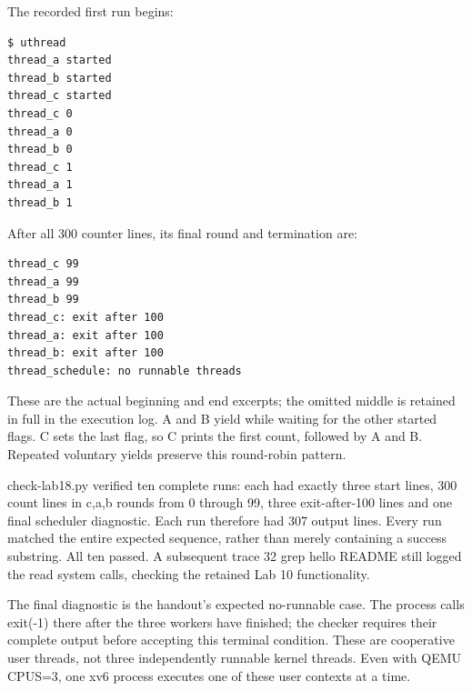 \documentclass[12pt,a4paper]{article}
\begin{document}
The recorded first run begins:

\par\noindent\begin{minipage}{\linewidth}

\begin{lstlisting}
$ uthread
thread_a started
thread_b started
thread_c started
thread_c 0
thread_a 0
thread_b 0
thread_c 1
thread_a 1
thread_b 1
\end{lstlisting}

\end{minipage}\par

After all 300 counter lines, its final round and termination are:

\par\noindent\begin{minipage}{\linewidth}

\begin{lstlisting}
thread_c 99
thread_a 99
thread_b 99
thread_c: exit after 100
thread_a: exit after 100
thread_b: exit after 100
thread_schedule: no runnable threads
\end{lstlisting}

\end{minipage}\par

These are the actual beginning and end excerpts; the omitted middle is
retained in full in the execution log. A and B yield while waiting for
the other started flags. C sets the last flag, so C prints the first
count, followed by A and B. Repeated voluntary yields preserve this
round-robin pattern.

{\ttfamily\fontsize{10}{12}\selectfont check-lab18.\allowbreak{}py}
verified ten complete runs: each had exactly three start lines, 300
count lines in {\ttfamily\fontsize{10}{12}\selectfont c,a,b} rounds from
0 through 99, three exit-after-100 lines and one final scheduler
diagnostic. Each run therefore had 307 output lines. Every run matched
the entire expected sequence, rather than merely containing a success
substring. All ten passed. A subsequent
{\ttfamily\fontsize{10}{12}\selectfont trace 32 grep hello README} still
logged the read system calls, checking the retained Lab 10
functionality.

The final diagnostic is the handout's expected no-runnable case. The
process calls {\ttfamily\fontsize{10}{12}\selectfont exit(-1)} there
after the three workers have finished; the checker requires their
complete output before accepting this terminal condition. These are
cooperative user threads, not three independently runnable kernel
threads. Even with QEMU CPUS=3, one xv6 process executes one of these
user contexts at a time.
\end{document}
